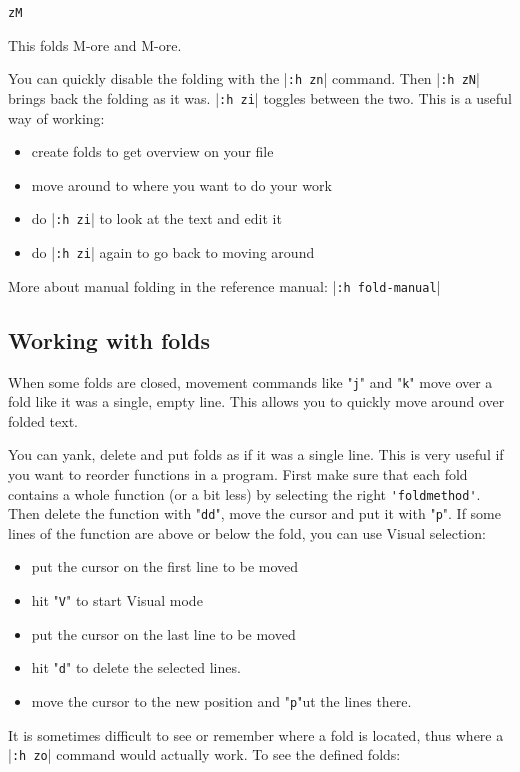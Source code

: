 \begin{Verbatim}[samepage=true]
 zM
\end{Verbatim}

This folds M-ore and M-ore.

You can quickly disable the folding with the |\verb!:h zn!| command.
Then |\verb!:h zN!| brings back the folding as it was.
|\verb!:h zi!| toggles between the two.
This is a useful way of working:

\begin{itemize}
\item create folds to get overview on your file
\item move around to where you want to do your work
\item do |\verb!:h zi!| to look at the text and edit it
\item do |\verb!:h zi!| again to go back to moving around
\end{itemize}

More about manual folding in the reference manual: |\verb!:h fold-manual!|
\subsection{Working with folds}
When some folds are closed, movement commands like "\verb!j!" and "\verb!k!" move over a fold like it was a single, empty line.
This allows you to quickly move around over folded text.

You can yank, delete and put folds as if it was a single line.
This is very useful if you want to reorder functions in a program.
First make sure that each fold contains a whole function (or a bit less) by selecting the right \verb!'foldmethod'!.
Then delete the function with "\verb!dd!", move the cursor and put it with "\verb!p!".
If some lines of the function are above or below the fold, you can use Visual selection:

\begin{itemize}
\item put the cursor on the first line to be moved
\item hit "\verb!V!" to start Visual mode
\item put the cursor on the last line to be moved
\item hit "\verb!d!" to delete the selected lines.
\item move the cursor to the new position and "\verb!p!"ut the lines there.
\end{itemize}

It is sometimes difficult to see or remember where a fold is located, thus where a |\verb!:h zo!| command would actually work.
To see the defined folds:

